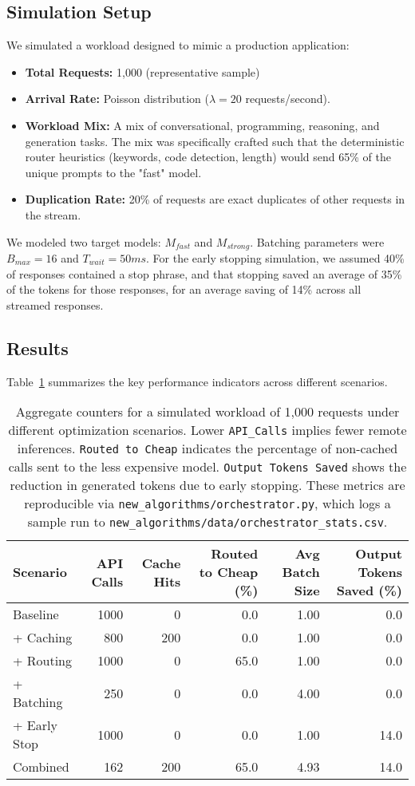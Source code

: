 \documentclass[11pt]{article}
\begin{document}
\subsection{Simulation Setup}
We simulated a workload designed to mimic a production application:
\begin{itemize}
    \item \textbf{Total Requests:} 1,000 (representative sample)
    \item \textbf{Arrival Rate:} Poisson distribution ($\lambda=20$ requests/second).
    \item \textbf{Workload Mix:} A mix of conversational, programming, reasoning, and generation tasks. The mix was specifically crafted such that the deterministic router heuristics (keywords, code detection, length) would send 65\% of the unique prompts to the "fast" model.
    \item \textbf{Duplication Rate:} 20\% of requests are exact duplicates of other requests in the stream.
\end{itemize}
We modeled two target models: $M_{fast}$ and $M_{strong}$. Batching parameters were $B_{max}=16$ and $T_{wait}=50ms$. For the early stopping simulation, we assumed 40\% of responses contained a stop phrase, and that stopping saved an average of 35\% of the tokens for those responses, for an average saving of 14\% across all streamed responses.

\subsection{Results}
Table~\ref{tab:results} summarizes the key performance indicators across different scenarios.

\begin{table}[h]
\centering
\begin{tabular}{lrrrrr}
\toprule
Scenario & API Calls & Cache Hits & Routed to Cheap (\%) & Avg Batch Size & Output Tokens Saved (\%) \\
\midrule
Baseline & 1000 & 0 & 0.0 & 1.00 & 0.0 \\
+ Caching & 800 & 200 & 0.0 & 1.00 & 0.0 \\
+ Routing & 1000 & 0 & 65.0 & 1.00 & 0.0 \\
+ Batching & 250 & 0 & 0.0 & 4.00 & 0.0 \\
+ Early Stop & 1000 & 0 & 0.0 & 1.00 & 14.0 \\
Combined & 162 & 200 & 65.0 & 4.93 & 14.0 \\
\bottomrule
\end{tabular}
\caption{Aggregate counters for a simulated workload of 1,000 requests under different optimization scenarios. Lower \texttt{API\_Calls} implies fewer remote inferences. \texttt{Routed to Cheap} indicates the percentage of non-cached calls sent to the less expensive model. \texttt{Output Tokens Saved} shows the reduction in generated tokens due to early stopping. These metrics are reproducible via \texttt{new\_algorithms/orchestrator.py}, which logs a sample run to \texttt{new\_algorithms/data/orchestrator\_stats.csv}.}
\label{tab:results}
\end{table}
\end{document}
